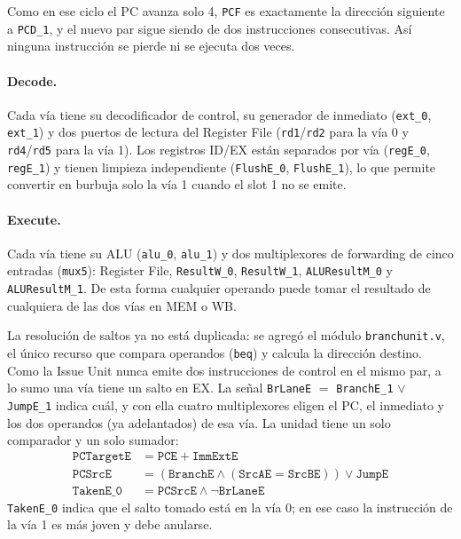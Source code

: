 \documentclass[12pt,a4paper]{article}
\begin{document}


\noindent Como en ese ciclo el PC avanza solo 4, \texttt{PCF} es exactamente la dirección siguiente a \texttt{PCD\_1}, y el nuevo par sigue siendo de dos instrucciones consecutivas. Así ninguna instrucción se pierde ni se ejecuta dos veces.

\paragraph{Decode.} Cada vía tiene su decodificador de control, su generador de inmediato (\texttt{ext\_0}, \texttt{ext\_1}) y dos puertos de lectura del Register File (\texttt{rd1}/\texttt{rd2} para la vía 0 y \texttt{rd4}/\texttt{rd5} para la vía 1). Los registros ID/EX están separados por vía (\texttt{regE\_0}, \texttt{regE\_1}) y tienen limpieza independiente (\texttt{FlushE\_0}, \texttt{FlushE\_1}), lo que permite convertir en burbuja solo la vía 1 cuando el slot 1 no se emite.

\paragraph{Execute.} Cada vía tiene su ALU (\texttt{alu\_0}, \texttt{alu\_1}) y dos multiplexores de forwarding de cinco entradas (\texttt{mux5}): Register File, \texttt{ResultW\_0}, \texttt{ResultW\_1}, \texttt{ALUResultM\_0} y \texttt{ALUResultM\_1}. De esta forma cualquier operando puede tomar el resultado de cualquiera de las dos vías en MEM o WB.

La resolución de saltos ya no está duplicada: se agregó el módulo \texttt{branchunit.v}, el único recurso que compara operandos (\texttt{beq}) y calcula la dirección destino. Como la Issue Unit nunca emite dos instrucciones de control en el mismo par, a lo sumo una vía tiene un salto en EX. La señal \texttt{BrLaneE} $=$ \texttt{BranchE\_1} $\lor$ \texttt{JumpE\_1} indica cuál, y con ella cuatro multiplexores eligen el PC, el inmediato y los dos operandos (ya adelantados) de esa vía. La unidad tiene un solo comparador y un solo sumador:
\begin{align}
\texttt{PCTargetE} &= \texttt{PCE} + \texttt{ImmExtE} \\
\texttt{PCSrcE} &= (\texttt{BranchE} \land (\texttt{SrcAE} = \texttt{SrcBE})) \lor \texttt{JumpE} \\
\texttt{TakenE\_0} &= \texttt{PCSrcE} \land \lnot\texttt{BrLaneE}
\end{align}
\texttt{TakenE\_0} indica que el salto tomado está en la vía 0; en ese caso la instrucción de la vía 1 es más joven y debe anularse.
\end{document}
